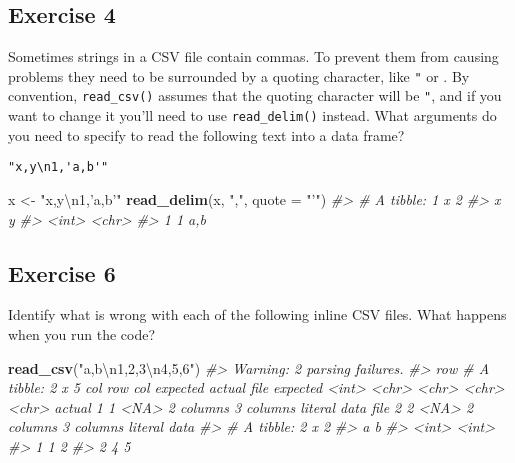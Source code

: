 \documentclass[]{book}
\newenvironment{Shaded}{\begin{snugshade}}{\end{snugshade}}
\newcommand{\CharTok}[1]{\textcolor[rgb]{0.31,0.60,0.02}{#1}}
\newcommand{\CommentTok}[1]{\textcolor[rgb]{0.56,0.35,0.01}{\textit{#1}}}
\newcommand{\DataTypeTok}[1]{\textcolor[rgb]{0.13,0.29,0.53}{#1}}
\newcommand{\KeywordTok}[1]{\textcolor[rgb]{0.13,0.29,0.53}{\textbf{#1}}}
\newcommand{\NormalTok}[1]{#1}
\newcommand{\StringTok}[1]{\textcolor[rgb]{0.31,0.60,0.02}{#1}}
\theoremstyle{plain}
\theoremstyle{remark}
\theoremstyle{definition}
\theoremstyle{definition}
\theoremstyle{definition}
\theoremstyle{remark}
\begin{document}
\hypertarget{exercise-4-13}{%
\subsection{Exercise 4}\label{exercise-4-13}}

Sometimes strings in a CSV file contain commas. To prevent them from
causing problems they need to be surrounded by a quoting character, like
\texttt{"} or \texttt{\textquotesingle{}}. By convention,
\texttt{read\_csv()} assumes that the quoting character will be
\texttt{"}, and if you want to change it you'll need to use
\texttt{read\_delim()} instead. What arguments do you need to specify to
read the following text into a data frame?

\begin{verbatim}
"x,y\n1,'a,b'"
\end{verbatim}

\begin{Shaded}
\begin{Highlighting}[]
\NormalTok{x <-}\StringTok{ "x,y}\CharTok{\textbackslash{}n}\StringTok{1,'a,b'"}
\KeywordTok{read_delim}\NormalTok{(x, }\StringTok{","}\NormalTok{, }\DataTypeTok{quote =} \StringTok{"'"}\NormalTok{)}
\CommentTok{#> # A tibble: 1 x 2}
\CommentTok{#>       x y    }
\CommentTok{#>   <int> <chr>}
\CommentTok{#> 1     1 a,b}
\end{Highlighting}
\end{Shaded}

\hypertarget{exercise-6-7}{%
\subsection{Exercise 6}\label{exercise-6-7}}

Identify what is wrong with each of the following inline CSV files. What
happens when you run the code?

\begin{Shaded}
\begin{Highlighting}[]
\KeywordTok{read_csv}\NormalTok{(}\StringTok{"a,b}\CharTok{\textbackslash{}n}\StringTok{1,2,3}\CharTok{\textbackslash{}n}\StringTok{4,5,6"}\NormalTok{)}
\CommentTok{#> Warning: 2 parsing failures.}
\CommentTok{#> row # A tibble: 2 x 5 col     row col   expected  actual    file         expected   <int> <chr> <chr>     <chr>     <chr>        actual 1     1 <NA>  2 columns 3 columns literal data file 2     2 <NA>  2 columns 3 columns literal data}
\CommentTok{#> # A tibble: 2 x 2}
\CommentTok{#>       a     b}
\CommentTok{#>   <int> <int>}
\CommentTok{#> 1     1     2}
\CommentTok{#> 2     4     5}
\end{Highlighting}
\end{Shaded}
\end{document}
